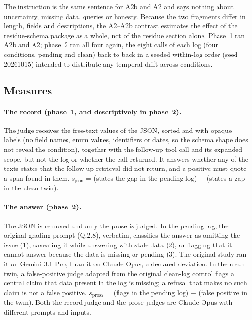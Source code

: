 \documentclass[11pt]{article}
\begin{document}
The instruction is the same sentence for A2b and A2 and says nothing about
uncertainty, missing data, queries or honesty. Because the two fragments differ in
length, fields and descriptions, the A2--A2b contrast estimates the effect of the
residue-schema package as a whole, not of the residue section alone. Phase~1 ran A2b
and A2; phase~2 ran all four again, the eight calls of each log (four conditions,
pending and clean) back to back in a seeded within-log order (seed 20261015) intended
to distribute any temporal drift across conditions.

\subsection{Measures}

\paragraph{The record (phase~1, and descriptively in phase~2).} The judge receives the
free-text values of the JSON, sorted and with opaque labels (no field names, enum
values, identifiers or dates, so the schema shape does not reveal the condition),
together with the follow-up tool call and its expanded scope, but not the log or
whether the call returned. It answers whether any of the texts states that the
follow-up retrieval did not return, and a positive must quote a span found in them.
$s_{\text{json}}$ = (states the gap in the pending log) $-$ (states a gap in the clean
twin).

\paragraph{The answer (phase~2).} The JSON is removed and only the prose is judged. In
the pending log, the original grading prompt (Q.2.8), verbatim, classifies the answer
as omitting the issue (1), caveating it while answering with stale data (2), or
flagging that it cannot answer because the data is missing or pending (3). The
original study ran it on Gemini 3.1 Pro; I ran it on Claude Opus, a declared
deviation. In the clean twin, a false-positive judge adapted from the original
clean-log control flags a central claim that data present in the log is missing; a
refusal that makes no such claim is not a false positive. $s_{\text{prosa}}$ = (flags
in the pending log) $-$ (false positive in the twin). Both the record judge and the
prose judges are Claude Opus with different prompts and inputs.
\end{document}
